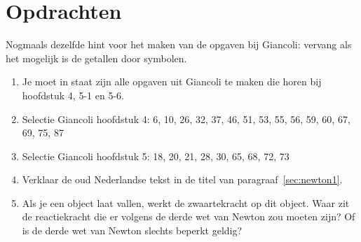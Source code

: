 \section{Opdrachten}

Nogmaals dezelfde hint voor het maken van de opgaven bij Giancoli: vervang als
het mogelijk is de getallen door symbolen.
\begin{enumerate}
\item Je moet in staat zijn alle opgaven uit Giancoli te maken die horen bij hoofdstuk 4, 5-1
en 5-6.
\item Selectie Giancoli hoofdstuk 4:  6, 10, 26, 32, 37, 46, 51, 53, 55, 56, 59, 60, 67, 69, 75, 87
\item Selectie Giancoli hoofdstuk 5: 18, 20, 21, 28, 30, 65, 68, 72, 73
\item Verklaar de oud Nederlandse tekst in de titel van paragraaf~\ref{sec:newton1}.
\item Als je een object laat vallen, werkt de zwaartekracht op dit object. Waar zit de reactiekracht
die er volgens de derde wet van Newton zou moeten zijn? Of is de derde wet van Newton
slechts beperkt geldig?
\end{enumerate}


